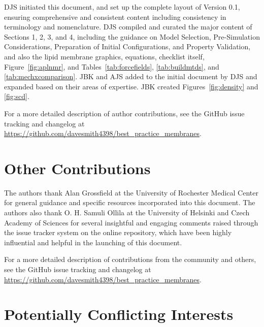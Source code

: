 \documentclass[9pt,bestpractices,pubversion]{livecoms}
\newcommand{\githubrepository}{\url{https://github.com/davesmith4398/best_practice_membranes}}  %
\begin{document}
DJS initiated this document, and set up the complete layout of Version 0.1, ensuring comprehensive and consistent content including consistency in terminology and nomenclature.
DJS compiled and curated the major content of Sections 1, 2, 3, and 4, including the guidance on Model Selection, Pre-Simulation Considerations, Preparation of Initial Configurations, and Property Validation, and also the lipid membrane graphics, equations, checklist itself, Figure~\ref{fig:aplnmr}, and Tables~\ref{tab:forcefields}, \ref{tab:buildmtds}, and \ref{tab:mechxcomparison}.
JBK and AJS added to the initial document by DJS and expanded based on their areas of expertise.
JBK created Figures~\ref{fig:density} and \ref{fig:scd}.

For a more detailed description of author contributions,
see the GitHub issue tracking and changelog at \githubrepository.


\section{Other Contributions}
%

The authors thank Alan Grossfield at the University of Rochester Medical Center for general guidance and specific resources incorporated into this document.
The authors also thank O. H. Samuli Ollila at the University of Helsinki and Czech Academy of Sciences for several insightful and engaging comments raised through the issue tracker system on the online repository, which have been highly influential and helpful in the launching of this document.

For a more detailed description of contributions from the community and others, see the GitHub issue tracking and changelog at \githubrepository.

\section{Potentially Conflicting Interests}
\end{document}
